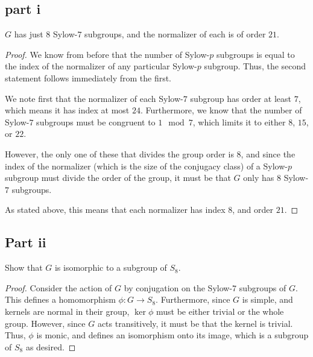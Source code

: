 \documentclass[12pt,reqno]{amsart}
\begin{document}
\subsection*{part i}
$G$ has just $8$ Sylow-$7$ subgroups, and the normalizer of each is of order
$21$.
\\
\begin{proof}
We know from before that the number of Sylow-$p$ subgroups is equal to the index
    of the normalizer of any particular Sylow-$p$ subgroup. Thus, the second
    statement follows immediately from the first.

    We note first that the normalizer of each Sylow-$7$ subgroup has order at
    least $7$, which means it has index at most $24$. Furthermore, we know that
    the number of Sylow-$7$ subgroups must be congruent to $1\mod 7$, which
    limits it to either $8$, $15$, or $22$.

    However, the only one of these that divides the group order is $8$, and
    since the index of the normalizer (which is the size of the conjugacy class)
    of a Sylow-$p$ subgroup must divide the order of the group, it must be that
    $G$ only has $8$ Sylow-$7$ subgroups.

    As stated above, this means that each normalizer has index $8$, and order
    $21$.
\end{proof}

\subsection*{Part ii}
Show that $G$ is isomorphic to a subgroup of $S_8$.
\\
\begin{proof}
Consider the action of $G$ by conjugation on the Sylow-$7$ subgroups of $G$.
    This defines a homomorphism $\phi:G\to S_8$. Furthermore, since $G$ is
    simple, and kernels are normal in their group, $\ker \phi$ must be either
    trivial or the whole group. However, since $G$ acts transitively, it must be
    that the kernel is trivial. Thus, $\phi$ is monic, and defines an
    isomorphism onto its image, which is a subgroup of $S_8$ as desired.
\end{proof}
\end{document}
